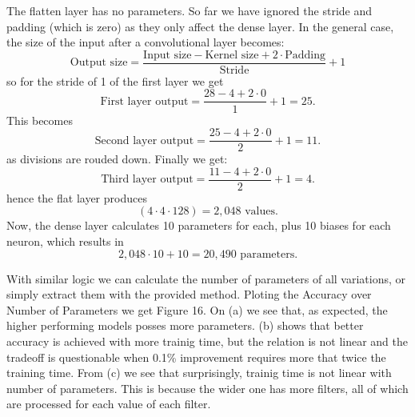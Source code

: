 \documentclass{article}
\begin{document}
The flatten layer has no parameters. So far we have ignored the stride and padding (which is zero) as they only affect the dense layer.
In the general case, the size of the input after a convolutional layer becomes:
\[
\text{Output size} = \frac{\text{Input size} - \text{Kernel size} + 2 \cdot \text{Padding}}{\text{Stride}} + 1
\]
so for the stride of 1 of the first layer we get
\[
\text{First layer output} = \frac{28 - 4 + 2 \cdot 0}{1} + 1 = 25.
\]
This becomes 
\[
\text{Second layer output} = \frac{25 - 4 + 2 \cdot 0}{2} + 1 = 11.
\]
as divisions are rouded down. Finally we get:
\[
\text{Third layer output} = \frac{11 - 4 + 2 \cdot 0}{2} + 1 = 4.
\]
hence the flat layer produces 
\[
(4 \cdot 4 \cdot 128) = 2,048 \text{ values}.
\]
Now, the dense layer calculates 10 parameters for each, plus 10 biases for each neuron, which results in
\[
2,048 \cdot 10 + 10 = 20,490 \text{ parameters}.
\]


With similar logic we can calculate the number of parameters of all variations, or simply extract them with the provided method.
Ploting the Accuracy over Number of Parameters we get Figure 16. On (a) we see that, as expected, the higher performing models posses more parameters.
(b) shows that better accuracy is achieved with more trainig time, but the relation is not linear and the tradeoff is questionable when 0.1\% improvement requires more that twice the training time.
From (c) we see that surprisingly, trainig time is not linear with number of parameters. This is because the wider one has more filters, all of which are processed for each value of each filter.
\end{document}
